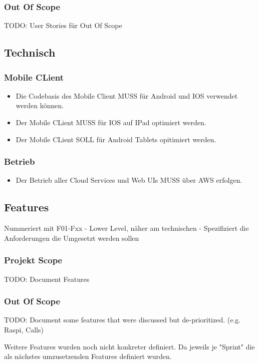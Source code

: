     \subsubsection*{Out Of Scope}

        TODO: User Stories für Out Of Scope

\subsection{Technisch}\label{subsec:technisch}

\subsubsection*{Mobile CLient}

        \begin{itemize}
            \item Die Codebasis des Mobile Client MUSS für Android und IOS verwendet werden können.  
            \item Der Mobile CLient MUSS für IOS auf IPad optimiert werden.  
            \item Der Mobile CLient SOLL für Android Tablets opitimiert werden.  
        \end{itemize}

    \subsubsection*{Betrieb}

        \begin{itemize}
            \item Der Betrieb aller Cloud Services und Web UIs MUSS über AWS erfolgen. 
        \end{itemize}

\subsection{Features}\label{subsec:features}

Nummeriert mit F01-Fxx - Lower Level, näher am technischen - Spezifiziert die Anforderungen die Umgesetzt werden sollen

    \subsubsection*{Projekt Scope}

        TODO: Document Features


    \subsubsection*{Out Of Scope}

        TODO: Document some features that were discussed but de-prioritized. (e.g. Raspi, Calls)
        
        Weitere Features wurden noch nicht konkreter definiert. Da jeweils je "Sprint" die als nächstes umzusetzenden Features definiert wurden. 